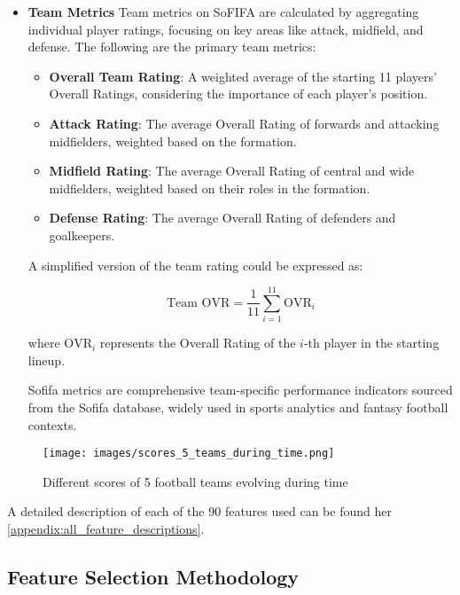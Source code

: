 \begin{itemize}
\item \textbf{Team Metrics}
    Team metrics on SoFIFA are calculated by aggregating individual player ratings, focusing on key areas like attack, midfield, and defense. The following are the primary team metrics:
    
    \begin{itemize}
        \item \textbf{Overall Team Rating}: A weighted average of the starting 11 players' Overall Ratings, considering the importance of each player's position.
        \item \textbf{Attack Rating}: The average Overall Rating of forwards and attacking midfielders, weighted based on the formation.
        \item \textbf{Midfield Rating}: The average Overall Rating of central and wide midfielders, weighted based on their roles in the formation.
        \item \textbf{Defense Rating}: The average Overall Rating of defenders and goalkeepers.
    \end{itemize}
    
    A simplified version of the team rating could be expressed as:
    
    \[
    \text{Team OVR} = \frac{1}{11} \sum_{i=1}^{11} \text{OVR}_i
    \]
    
    where \( \text{OVR}_i \) represents the Overall Rating of the $i$-th player in the starting lineup.
    
    
    Sofifa metrics are comprehensive team-specific performance indicators sourced from the Sofifa database, widely used in sports analytics and fantasy football contexts.
\end{itemize}

\begin{figure}[H]
    \centering
    \texttt{[image: images/scores\_5\_teams\_during\_time.png]}
    \caption{Different scores of 5 football teams evolving during time}
    \label{fig:scores_5_teams_during_time}
\end{figure}

A detailed description of each of the 90 features used can be found her \ref{appendix:all_feature_descriptions}.

\subsection{Feature Selection Methodology}
\label{subsec:feature_selection_methodology}

